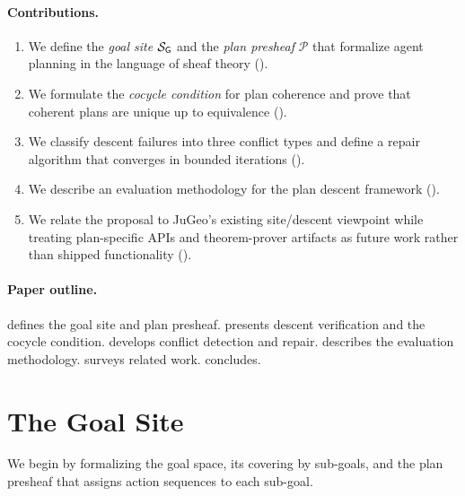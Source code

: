 \documentclass[11pt]{article}
\newcommand{\PlanSheaf}{\mathcal{P}}
\newcommand{\GoalSite}{\Site_{\mathsf{G}}}
\begin{document}
\paragraph{Contributions.}
\begin{enumerate}[leftmargin=*,itemsep=2pt]
  \item We define the \emph{goal site} $\GoalSite$ and the
    \emph{plan presheaf} $\PlanSheaf$ that formalize agent
    planning in the language of sheaf theory
    ().
  \item We formulate the \emph{cocycle condition} for plan
    coherence and prove that coherent plans are unique up to
    equivalence ().
  \item We classify descent failures into three conflict types
     and define a repair algorithm that converges in bounded
     iterations ().
  \item We describe an evaluation methodology for the plan descent
     framework ().
  \item We relate the proposal to JuGeo's existing site/descent
    viewpoint while treating plan-specific APIs and theorem-prover
    artifacts as future work rather than shipped functionality
    ().
\end{enumerate}

\paragraph{Paper outline.}
 defines the goal site and plan presheaf.
 presents descent verification and the cocycle
condition.   develops conflict detection and
repair.   describes the evaluation methodology.
 surveys related work.
 concludes.


\section{The Goal Site}\label{sec:goal-site}

We begin by formalizing the goal space, its covering by sub-goals,
and the plan presheaf that assigns action sequences to each
sub-goal.

\end{document}
